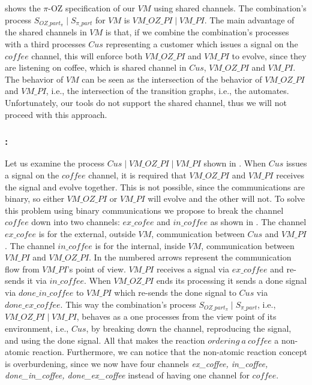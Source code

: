  shows the $\pi$-OZ specification of our $VM$ using shared channels.
The combination's process $S_{OZ\_part_\pi} \mid S_{\pi\_part}$ for $VM$ is $VM\_OZ\_PI \mid VM\_PI$. The main advantage of the shared channels in $VM$ is that, if we combine the combination's processes with a third processes $Cus$ representing a customer which issues a signal on the $coffee$ channel, this will enforce both $VM\_OZ\_PI$ and $VM\_PI$ to evolve, since they are listening on coffee, which is shared channel in  $Cus$, $VM\_OZ\_PI$ and $VM\_PI$. The behavior of $VM$ can be seen as the intersection of the behavior of  $VM\_OZ\_PI$ and $VM\_PI$, i.e., the intersection of the transition graphs, i.e., the automates. Unfortunately, our tools do not support the shared channel, thus we will not proceed with this approach.




\subsubsection{:} Let us examine the process $Cus \mid VM\_OZ\_PI \mid VM\_PI$ shown in . When $Cus$ issues a signal on the $coffee$ channel, it is required that $VM\_OZ\_PI$ and $VM\_PI$ receives the signal and evolve together. This is not possible, since the \picalc{} communications are binary, so either $VM\_OZ\_PI$ or $VM\_PI$ will evolve and the other will not. To solve this problem using binary communications we propose to break the channel $coffee$ down into two channels: $ex\_cofee$ and $in\_coffee$ as shown in . The channel $ex\_cofee$ is for the external, outside $VM$, communication between $Cus$ and $VM\_PI$. The channel $in\_coffee$ is for the internal, inside $VM$, communication between $VM\_PI$ and $VM\_OZ\_PI$. In  the numbered arrows represent the communication flow from $VM\_PI$'s point of view. $VM\_PI$  receives a signal via $ex\_coffee$ and re-sends it via $in\_coffee$. When $VM\_OZ\_PI$ ends its processing it sends a done signal via  $done\_in\_coffee$ to $VM\_PI$ which re-sends the done signal to $Cus$ via $done\_ex\_coffee$. This way the combination's process $S_{OZ\_part_\pi} \mid S_{\pi\_part}$, i.e., $VM\_OZ\_PI \mid VM\_PI$, behaves as a one processes from the view point of its environment, i.e., $Cus$, by breaking down the channel, reproducing the signal, and using the done signal. All that makes the reaction $ordering\ a\ coffee$ a non-atomic reaction. Furthermore, we can notice  that the non-atomic reaction concept is overburdening, since we now have four channels \textit{ex\_coffee, in\_coffee, done\_in\_coffee, done\_ex\_coffee} instead of having one channel for $coffee$.

